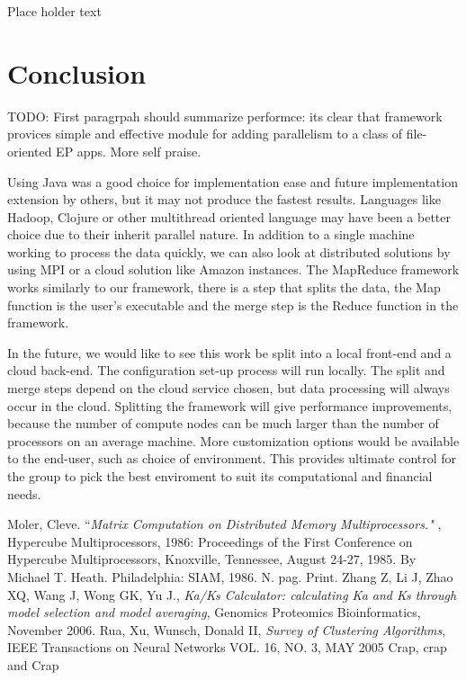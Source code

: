 \documentclass[12pt]{article}
\begin{document}
Place holder text

\section{Conclusion}

TODO: First paragrpah should summarize performce: its clear that framework
provices simple and effective module for adding parallelism to a class of
file-oriented EP apps. More self praise.

Using Java was a good choice for implementation ease and future implementation
extension by others, but it may not produce the fastest results. Languages like
Hadoop, Clojure or other multithread oriented language may have been a better
choice due to their inherit parallel nature. In addition to a single machine
working to process the data quickly, we can also look at distributed solutions
by using MPI or a cloud solution like Amazon instances. The MapReduce framework
works similarly to our framework, there is a step that splits the data, the Map
function is the user's executable and the merge step is the Reduce function in
the framework. 

In the future, we would like to see this work be split into a local front-end
and a cloud back-end. The configuration set-up process will run locally. The
split and merge steps depend on the cloud service chosen, but data processing
will always occur in the cloud. Splitting the framework will give performance
improvements, because the number of compute nodes can be much larger than the
number of processors on an average machine. More customization options would be
available to the end-user, such as choice of environment. This provides ultimate
control for the group to pick the best enviroment to suit its computational and
financial needs.

\begin{thebibliography}{1}
Moler, Cleve. ``\emph{Matrix Computation on Distributed Memory Multiprocessors."
}, Hypercube Multiprocessors, 1986: Proceedings of the First Conference on
Hypercube Multiprocessors, Knoxville, Tennessee, August 24-27, 1985. By Michael
T. Heath. Philadelphia: SIAM, 1986. N. pag. Print.
Zhang Z, Li J, Zhao XQ, Wang J, Wong GK, Yu J., \emph{Ka/Ks Calculator: 
calculating Ka and Ks through model selection and model averaging},
Genomics Proteomics Bioinformatics, November 2006.
Rua, Xu, Wunsch, Donald II, \emph{Survey of Clustering Algorithms},
IEEE Transactions on Neural Networks VOL. 16, NO. 3, MAY 2005
Crap, crap and Crap
\end{thebibliography}
\end{document}
